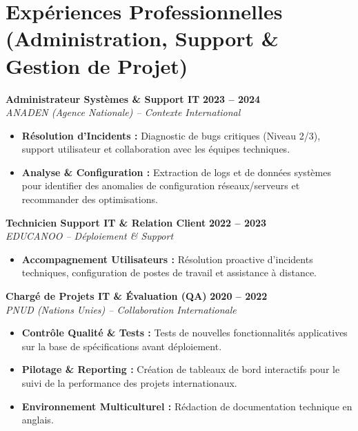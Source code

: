 \documentclass[10pt,a4paper]{article}
\begin{document}
\section*{Expériences Professionnelles (Administration, Support \& Gestion de Projet)}

\textbf{Administrateur Systèmes \& Support IT} \hfill \textbf{2023 – 2024}\\
\textit{ANADEN (Agence Nationale) -- Contexte International}
\begin{itemize}[leftmargin=1.5em, nosep, topsep=0.1em]
    \item \textbf{Résolution d'Incidents :} Diagnostic de bugs critiques (Niveau 2/3), support utilisateur et collaboration avec les équipes techniques.
    \item \textbf{Analyse \& Configuration :} Extraction de logs et de données systèmes pour identifier des anomalies de configuration réseaux/serveurs et recommander des optimisations.
\end{itemize}
\vspace{0.15em} 

\textbf{Technicien Support IT \& Relation Client} \hfill \textbf{2022 – 2023}\\
\textit{EDUCANOO -- Déploiement \& Support}
\begin{itemize}[leftmargin=1.5em, nosep, topsep=0.1em]
    \item \textbf{Accompagnement Utilisateurs :} Résolution proactive d'incidents techniques, configuration de postes de travail et assistance à distance.
\end{itemize}
\vspace{0.15em}

\textbf{Chargé de Projets IT \& Évaluation (QA)} \hfill \textbf{2020 – 2022}\\
\textit{PNUD (Nations Unies) -- Collaboration Internationale}
\begin{itemize}[leftmargin=1.5em, nosep, topsep=0.1em]
    \item \textbf{Contrôle Qualité \& Tests :} Tests de nouvelles fonctionnalités applicatives sur la base de spécifications avant déploiement.
    \item \textbf{Pilotage \& Reporting :} Création de tableaux de bord interactifs pour le suivi de la performance des projets internationaux.
    \item \textbf{Environnement Multiculturel :} Rédaction de documentation technique en anglais.
\end{itemize}
\end{document}
